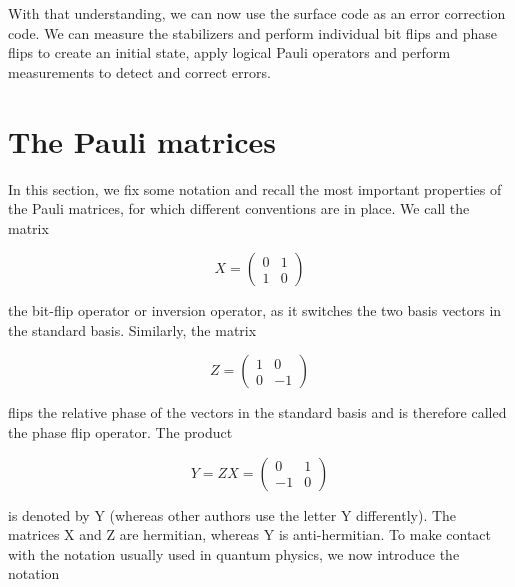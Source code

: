 \documentclass[a4paper, draft]{article}
\theoremstyle{own}
\theoremstyle{remark}
\begin{document}
With that understanding, we can now use the surface code as an error correction code. We can measure the stabilizers and perform individual bit flips and phase flips to create an initial state, apply logical Pauli operators and perform measurements to detect and correct errors.




\appendix


\section{The Pauli matrices}

In this section, we fix some notation and recall the most important properties of the Pauli matrices, for which different conventions are in place. We call the matrix

$$
X = \begin{pmatrix} 0 & 1 \\ 1 & 0\end{pmatrix}
$$

the bit-flip operator or inversion operator, as it switches the two basis vectors in the standard basis. Similarly, the matrix

$$
Z = \begin{pmatrix} 1 & 0 \\ 0 & -1\end{pmatrix}
$$

flips the relative phase of the vectors in the standard basis and is therefore called the phase flip operator. The product

$$
Y = ZX = \begin{pmatrix} 0 & 1 \\ -1 & 0\end{pmatrix}
$$

is denoted by Y (whereas other authors use the letter Y differently). The matrices X and Z are hermitian, whereas Y is anti-hermitian. To make contact with the notation usually used in quantum physics, we now introduce the notation
\end{document}
